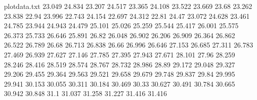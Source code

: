 \begin{filecontents*}{plotdata.txt}
23.049	24.834
23.207	24.517
23.365	24.108
23.522	23.669
23.68	23.262
23.838	22.94
23.996	22.743
24.154	22.697
24.312	22.81
24.47	23.072
24.628	23.461
24.785	23.944
24.943	24.479
25.101	25.026
25.259	25.544
25.417	26.001
25.575	26.373
25.733	26.646
25.891	26.82
26.048	26.902
26.206	26.909
26.364	26.862
26.522	26.789
26.68	26.713
26.838	26.66
26.996	26.646
27.153	26.685
27.311	26.783
27.469	26.939
27.627	27.146
27.785	27.395
27.943	27.671
28.101	27.96
28.259	28.246
28.416	28.519
28.574	28.767
28.732	28.986
28.89	29.172
29.048	29.327
29.206	29.455
29.364	29.563
29.521	29.658
29.679	29.748
29.837	29.84
29.995	29.941
30.153	30.055
30.311	30.184
30.469	30.33
30.627	30.491
30.784	30.665
30.942	30.848
31.1	31.037
31.258	31.227
31.416	31.416
\end{filecontents*}

\begin{filecontents*}{\democodefile}
\begin{figure}[H]
\pgfplotsset{width=0.8\textwidth, height=0.6\textwidth}
\centering
{}
\end{figure}
\end{filecontents*}

%

